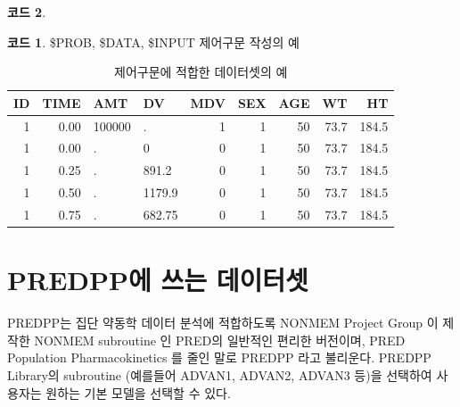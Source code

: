 \documentclass[
  10pt,
  krantz2,
  a4paper]{krantz}
\newenvironment{Shaded}{\begin{snugshade}}{\end{snugshade}}
\newcommand{\ErrorTok}[1]{\textcolor[rgb]{0.64,0.00,0.00}{\textbf{#1}}}
\newcommand{\NormalTok}[1]{#1}
\newcommand{\OperatorTok}[1]{\textcolor[rgb]{0.81,0.36,0.00}{\textbf{#1}}}
\theoremstyle{definition}
\theoremstyle{definition}
\newtheorem{example}{코드}[chapter]
\theoremstyle{definition}
\theoremstyle{remark}
\begin{document}
\begin{Shaded}
\end{Shaded}

\begin{example}
\begin{example}

\protect\hypertarget{exm:input}{}{\label{exm:input} }\$PROB, \$DATA, \$INPUT 제어구문 작성의 예

\end{example}
\end{example}

\begin{table}

\caption{\label{tab:tab}제어구문에 적합한 데이터셋의 예}
\centering
\begin{tabular}[t]{rrllrrrrr}
\toprule
ID & TIME & AMT & DV & MDV & SEX & AGE & WT & HT\\
\midrule
1 & 0.00 & 100000 & . & 1 & 1 & 50 & 73.7 & 184.5\\
1 & 0.00 & . & 0 & 0 & 1 & 50 & 73.7 & 184.5\\
1 & 0.25 & . & 891.2 & 0 & 1 & 50 & 73.7 & 184.5\\
1 & 0.50 & . & 1179.9 & 0 & 1 & 50 & 73.7 & 184.5\\
1 & 0.75 & . & 682.75 & 0 & 1 & 50 & 73.7 & 184.5\\
\bottomrule
\end{tabular}
\end{table}

\hypertarget{predppuxc5d0-uxc4f0uxb294-uxb370uxc774uxd130uxc14b}{%
\section{PREDPP에 쓰는 데이터셋}\label{predppuxc5d0-uxc4f0uxb294-uxb370uxc774uxd130uxc14b}}

PREDPP는 집단 약동학 데이터 분석에 적합하도록 NONMEM Project Group 이 제작한 NONMEM subroutine 인 PRED의 일반적인 편리한 버전이며, PRED Population Pharmacokinetics 를 줄인 말로 PREDPP 라고 불리운다. PREDPP Library의 subroutine (예를들어 ADVAN1, ADVAN2, ADVAN3 등)을 선택하여 사용자는 원하는 기본 모델을 선택할 수 있다.
\end{document}
